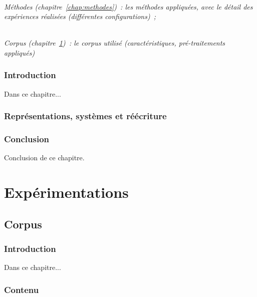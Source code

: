 \documentclass[a4paper,11pt,twoside]{memoir}
\begin{document}
\textit{\\Méthodes (chapitre~\ref{chap:methodes})~: les méthodes
appliquées, avec le détail des expériences réalisées (différentes
configurations)~;}

\textit{\\Corpus (chapitre~\ref{chap:corpus})~: le corpus utilisé
	\emph{(caractéristiques, pré-traitements appliqués)}}

\section{Introduction}
Dans ce chapitre...

%
\newpage

\section{Représentations, systèmes et réécriture}
\newpage

%
%
%

\section{Conclusion}
Conclusion de ce chapitre.



\part{Expérimentations}





\chapter{Corpus}
\label{chap:corpus}
\minitoc

\section{Introduction}
Dans ce chapitre...

%

\section{Contenu}

\end{document}
